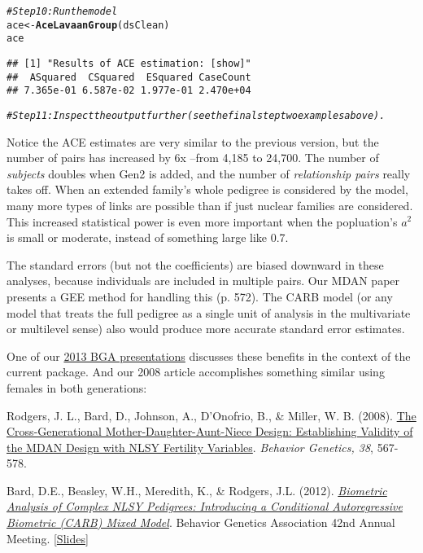 \documentclass{article}\usepackage[]{graphicx}\usepackage[]{color}
\makeatletter
\newcommand{\hlcom}[1]{\textcolor[rgb]{0.678,0.584,0.686}{\textit{#1}}}%
\newcommand{\hlstd}[1]{\textcolor[rgb]{0.345,0.345,0.345}{#1}}%
\newcommand{\hlkwb}[1]{\textcolor[rgb]{0.69,0.353,0.396}{#1}}%
\newcommand{\hlkwd}[1]{\textcolor[rgb]{0.737,0.353,0.396}{\textbf{#1}}}%
\newenvironment{kframe}{%
 \def\at@end@of@kframe{}%
 \ifinner\ifhmode%
  \def\at@end@of@kframe{\end{minipage}}%
  \begin{minipage}{\columnwidth}%
 \fi\fi%
 \def\FrameCommand##1{\hskip\@totalleftmargin \hskip-\fboxsep
 \colorbox{shadecolor}{##1}\hskip-\fboxsep
     \hskip-\linewidth \hskip-\@totalleftmargin \hskip\columnwidth}%
 \MakeFramed {\advance\hsize-\width
   \@totalleftmargin\z@ \linewidth\hsize
   \@setminipage}}%
 {\par\unskip\endMakeFramed%
 \at@end@of@kframe}
\newenvironment{knitrout}{}{} %
\makeatother
\begin{document}
\begin{knitrout}
\begin{kframe}
\begin{alltt}
\hlcom{#Step 10: Run the model}
\hlstd{ace} \hlkwb{<-} \hlkwd{AceLavaanGroup}\hlstd{(dsClean)}
\hlstd{ace}
\end{alltt}
\begin{verbatim}
## [1] "Results of ACE estimation: [show]"
##  ASquared  CSquared  ESquared CaseCount 
## 7.365e-01 6.587e-02 1.977e-01 2.470e+04
\end{verbatim}
\begin{alltt}
\hlcom{#Step 11: Inspect the output further (see the final step two examples above).}
\end{alltt}
\end{kframe}
\end{knitrout}


Notice the ACE estimates are very similar to the previous version, but the number of pairs has increased by 6x --from 4,185 to 24,700.  The number of \emph{subjects} doubles when Gen2 is added, and the number of \emph{relationship pairs} really takes off.  When an extended family's whole pedigree is considered by the model, many more types of links are possible than if just nuclear families are considered.  This increased statistical power is even more important when the popluation's $a^2$ is small or moderate, instead of something large like 0.7.

The standard errors (but not the coefficients) are biased downward in these analyses, because individuals are included in multiple pairs.  Our MDAN paper presents a GEE method for handling this (p. 572).  The CARB model (or any model that treats the full pedigree as a single unit of analysis in the multivariate or multilevel sense) also would produce more accurate standard error estimates.

One of our \href{https://r-forge.r-project.org/forum/forum.php?thread_id=28498&forum_id=4266&group_id=1330}{2013 BGA presentations}  discusses these benefits in the context of the current  package.  And our 2008 article accomplishes something similar using females in both generations:

Rodgers, J. L., Bard, D., Johnson, A., D'Onofrio, B., \& Miller, W. B. (2008). \href{http://www.ncbi.nlm.nih.gov/pubmed/18825497}{The Cross-Generational Mother-Daughter-Aunt-Niece Design: Establishing Validity of the MDAN Design with NLSY Fertility Variables}. \emph{Behavior Genetics, 38}, 567-578.

Bard, D.E., Beasley, W.H., Meredith, K., & Rodgers, J.L. (2012). \href{http://link.springer.com/article/10.1007/s10519-012-9566-6}{\emph{Biometric Analysis of Complex NLSY Pedigrees: Introducing a Conditional Autoregressive Biometric (CARB) Mixed Model}}. Behavior Genetics Association 42nd Annual Meeting. [\href{https://r-forge.r-project.org/forum/forum.php?thread_id=4761&forum_id=4266&group_id=1330}{Slides}]
\end{document}
